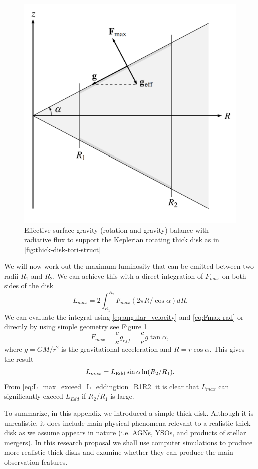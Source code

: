 \documentclass[a4paper,modern]{aastex62}
\begin{document}
%
\begin{figure}[hbt!]
\includegraphics[width=\linewidth]{simple_geometry_geff_Lmax.png}
\caption{Effective surface gravity (rotation and gravity) balance with radiative flux to support the Keplerian rotating thick disk as in \ref{fig:thick-disk-tori-struct} }\label{fig:simple_geometry_geff_Lmax}
\end{figure}
%
We will now work out the maximum luminosity that can be emitted between two radii $R_1$ and $R_2$. We can achieve this with a direct integration of $F_{max}$ on both sides of the disk
\begin{equation}
    L_{max}=2\int_{R_1}^{R_2} F_{max} (2\pi R/\cos\alpha) dR .
\end{equation}
We can evaluate the integral using \ref{eq:angular_velocity} and \ref{eq:Fmax-rad} or directly by using simple geometry see Figure \ref{fig:simple_geometry_geff_Lmax}
\begin{equation}
    F_{max}=\frac{c}{\kappa} g_{eff} = \frac{c}{\kappa}g\tan\alpha,
\end{equation}
where $g=GM/r^2$ is the gravitational acceleration and $R=r\cos\alpha$.
This gives the result
\begin{equation} \label{eq:L_max_exceed_L_eddingtion_R1R2}
    L_{max}=L_{\rm{Edd}}\sin\alpha \ln (R_2/R_1).
\end{equation}
From \ref{eq:L_max_exceed_L_eddingtion_R1R2} it is clear that $L_{max}$ can significantly exceed $L_{Edd}$ if $R_2/R_1$ is large. 

To summarize, in this appendix we introduced a simple thick disk. Although it is unrealistic, it does include main physical phenomena relevant to a realistic thick disk as we assume appears in nature (i.e. AGNs, YSOs, and products of stellar mergers).
In this research proposal we shall use computer simulations to produce more realistic thick disks and examine whether they can produce the main observation features.


\newpage
%

\end{document}
